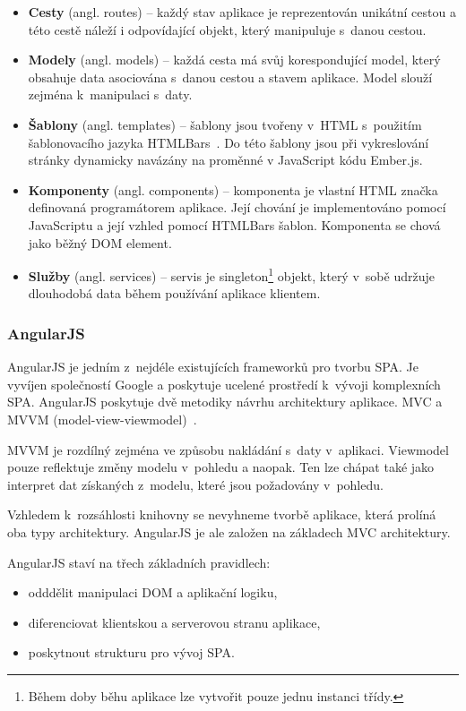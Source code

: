 \begin{itemize}  
    \item {\bf Cesty} (angl. routes) -- každý stav aplikace je reprezentován unikátní cestou a této cestě náleží i odpovídající objekt, který manipuluje s~danou cestou.
    \item {\bf Modely} (angl. models) -- každá cesta má svůj korespondující model, který obsahuje data asociována s~danou cestou a stavem aplikace. Model slouží zejména k~manipulaci s~daty.
    \item {\bf Šablony} (angl. templates) -- šablony jsou tvořeny v~HTML s~použitím šablonovacího jazyka HTMLBars~\cite{htmlbars}. Do této šablony jsou při vykreslování stránky dynamicky navázány na proměnné v JavaScript kódu Ember.js. 
    \item {\bf Komponenty} (angl. components) -- komponenta je vlastní HTML značka definovaná programátorem aplikace. Její chování je implementováno pomocí JavaScriptu a její vzhled pomocí HTMLBars šablon. Komponenta se chová jako běžný DOM element.
    \item {\bf Služby} (angl. services) -- servis je singleton\footnote{Během doby běhu aplikace lze vytvořit pouze jednu instanci třídy.} objekt, který v~sobě udržuje dlouhodobá data během používání aplikace klientem.
\end{itemize}

\subsubsection*{AngularJS}

AngularJS je jedním z~nejdéle existujících frameworků pro tvorbu SPA. Je vyvíjen společností Google a poskytuje ucelené prostředí k~vývoji komplexních SPA. AngularJS poskytuje dvě metodiky návrhu architektury aplikace. MVC a MVVM (model-view-viewmodel)~\cite{mvvm}.

MVVM je rozdílný zejména ve způsobu nakládání s~daty v~aplikaci. Viewmodel pouze reflektuje změny modelu v~pohledu a naopak. Ten lze chápat také jako interpret dat získaných z~modelu, které jsou požadovány v~pohledu.

Vzhledem k~rozsáhlosti knihovny se nevyhneme tvorbě aplikace, která prolíná oba typy architektury. AngularJS je ale založen na základech MVC architektury.

AngularJS staví na třech základních pravidlech:

\begin{itemize}
    \item odddělit manipulaci DOM a aplikační logiku,
    \item diferenciovat klientskou a serverovou stranu aplikace,
    \item poskytnout strukturu pro vývoj SPA.
\end{itemize}

